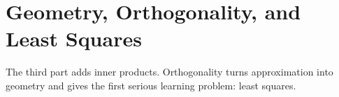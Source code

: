 \part{Geometry, Orthogonality, and Least Squares}

The third part adds inner products. Orthogonality turns approximation into
geometry and gives the first serious learning problem: least squares.
